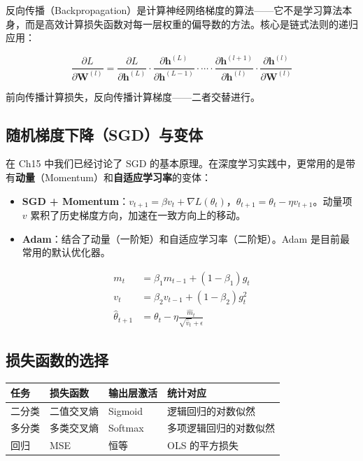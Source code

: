 \documentclass[
]{book}
\providecommand{\tightlist}{%
  \setlength{\itemsep}{0pt}\setlength{\parskip}{0pt}}
\begin{document}
反向传播（Backpropagation）是计算神经网络梯度的算法------它不是学习算法本身，而是高效计算损失函数对每一层权重的偏导数的方法。核心是链式法则的递归应用：

\[\frac{\partial L}{\partial \mathbf{W}^{(l)}} = \frac{\partial L}{\partial \mathbf{h}^{(L)}} \cdot \frac{\partial \mathbf{h}^{(L)}}{\partial \mathbf{h}^{(L-1)}} \cdot \cdots \cdot \frac{\partial \mathbf{h}^{(l+1)}}{\partial \mathbf{h}^{(l)}} \cdot \frac{\partial \mathbf{h}^{(l)}}{\partial \mathbf{W}^{(l)}}\]

前向传播计算损失，反向传播计算梯度------二者交替进行。

\subsection{随机梯度下降（SGD）与变体}\label{ux968fux673aux68afux5ea6ux4e0bux964dsgdux4e0eux53d8ux4f53}

在 Ch15 中我们已经讨论了 SGD 的基本原理。在深度学习实践中，更常用的是带有\textbf{动量}（Momentum）和\textbf{自适应学习率}的变体：

\begin{itemize}
\tightlist
\item
  \textbf{SGD + Momentum}：\(v_{t+1} = \beta v_t + \nabla L(\theta_t)\)，\(\theta_{t+1} = \theta_t - \eta v_{t+1}\)。动量项 \(v\) 累积了历史梯度方向，加速在一致方向上的移动。
\item
  \textbf{Adam}：结合了动量（一阶矩）和自适应学习率（二阶矩）。Adam 是目前最常用的默认优化器。
\end{itemize}

\[\begin{aligned}
m_t &= \beta_1 m_{t-1} + (1 - \beta_1) g_t \\
v_t &= \beta_2 v_{t-1} + (1 - \beta_2) g_t^2 \\
\hat{\theta}_{t+1} &= \theta_t - \eta \frac{\hat{m}_t}{\sqrt{\hat{v}_t} + \epsilon}
\end{aligned}\]

\subsection{损失函数的选择}\label{ux635fux5931ux51fdux6570ux7684ux9009ux62e9}

\begin{longtable}[]{@{}llll@{}}
\toprule\noalign{}
任务 & 损失函数 & 输出层激活 & 统计对应 \\
\midrule\noalign{}
\endhead
\bottomrule\noalign{}
\endlastfoot
二分类 & 二值交叉熵 & Sigmoid & 逻辑回归的对数似然 \\
多分类 & 多类交叉熵 & Softmax & 多项逻辑回归的对数似然 \\
回归 & MSE & 恒等 & OLS 的平方损失 \\
\end{longtable}
\end{document}
